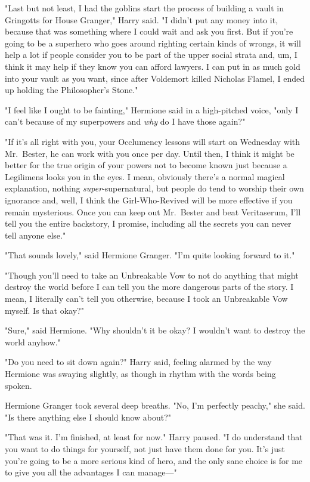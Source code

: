 "Last but not least, I had the goblins start the process of building a vault in
Gringotts for House Granger," Harry said. "I didn't put any money into it,
because that was something where I could wait and ask you first. But if you're
going to be a superhero who goes around righting certain kinds of wrongs, it
will help a lot if people consider you to be part of the upper social strata
and, um, I think it may help if they know you can afford lawyers. I can put in
as much gold into your vault as you want, since after Voldemort killed Nicholas
Flamel, I ended up holding the Philosopher's Stone."

"I feel like I ought to be fainting," Hermione said in a high-pitched voice,
"only I can't because of my superpowers and \emph{why} do I have those again?"

"If it's all right with you, your Occlumency lessons will start on Wednesday
with Mr.~Bester, he can work with you once per day. Until then, I think it
might be better for the true origin of your powers not to become known just
because a Legilimens looks you in the eyes. I mean, obviously there's a normal
magical explanation, nothing \emph{super}-supernatural, but people do tend to
worship their own ignorance and, well, I think the Girl-Who-Revived will be
more effective if you remain mysterious. Once you can keep out Mr.~Bester and
beat Veritaserum, I'll tell you the entire backstory, I promise, including all
the secrets you can never tell anyone else."

"That sounds lovely," said Hermione Granger. "I'm quite looking forward to it."

"Though you'll need to take an Unbreakable Vow to not do anything that might
destroy the world before I can tell you the more dangerous parts of the story.
I mean, I literally can't tell you otherwise, because I took an Unbreakable Vow
myself. Is that okay?"

"Sure," said Hermione. "Why shouldn't it be okay? I wouldn't want to destroy
the world anyhow."

"Do you need to sit down again?" Harry said, feeling alarmed by the way
Hermione was swaying slightly, as though in rhythm with the words being spoken.

Hermione Granger took several deep breaths. "No, I'm perfectly peachy," she
said. "Is there anything else I should know about?"

"That was it. I'm finished, at least for now." Harry paused. "I do understand
that you want to do things for yourself, not just have them done for you. It's
just{\el} you're going to be a more serious kind of hero, and the only sane
choice is for me to give you all the advantages I can manage\mbox{---}"

